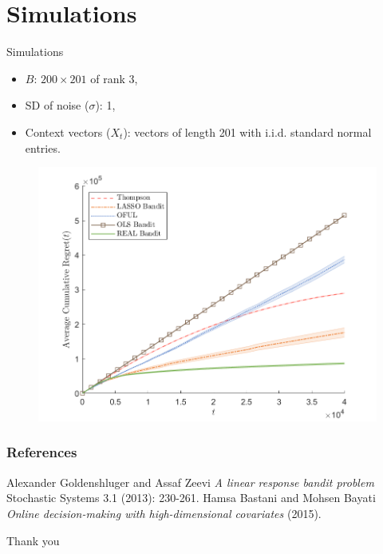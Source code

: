 \documentclass{beamer}
\begin{document}
\section{Simulations}

\begin{frame}{Simulations}
\begin{itemize}
\item $B$: $200\times 201$ of rank $3$,
\item SD of noise ($\sigma$): 1,
\item Context vectors ($X_t$): vectors of length 201 with i.i.d. standard normal entries.
\end{itemize}
\begin{figure}[H]
  \centering
  \includegraphics[scale=0.5]{images/regrets.png}
\end{figure}
\end{frame}

\begin{frame}
\frametitle{References}
\footnotesize{
\begin{thebibliography}{99}
 Alexander Goldenshluger and Assaf Zeevi
\newblock \emph{A linear response bandit problem}
\newblock Stochastic Systems 3.1 (2013): 230-261.
%
 Hamsa Bastani and Mohsen Bayati
\newblock \emph{Online decision-making with high-dimensional covariates}
\newblock (2015).
\end{thebibliography}
}
\end{frame}

\begin{frame}
\Huge{\centerline{Thank you}}
\end{frame}
\end{document}
